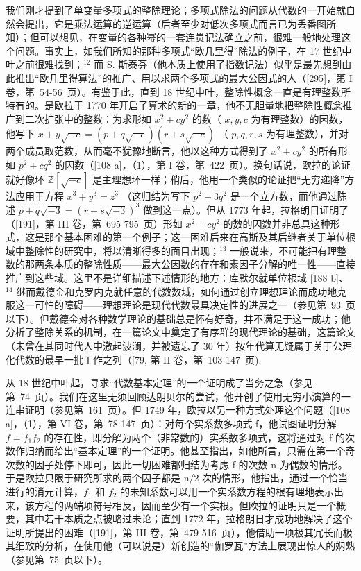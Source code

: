 我们刚才提到了单变量多项式的整除理论；多项式除法的问题从代数的一开始就自然会提出，它是乘法运算的逆运算（后者至少对低次多项式而言已为丢番图所知）；但可以想见，在变量的各种幂的一套连贯记法确立之前，很难一般地处理这个问题。事实上，如我们所知的那种多项式“欧几里得”除法的例子，在 17 世纪中叶之前很难找到；\(^{12}\) 而 S. 斯泰芬（他本质上使用了指数记法）似乎是最先想到由此推出“欧几里得算法”的推广、用以求两个多项式的最大公因式的人（{[}295{]}，第 I 卷，第~54-56~页）。有鉴于此，直到 18 世纪中叶，整除性概念一直是有理整数所特有的。是欧拉于 1770 年开启了算术的新的一章，他不无胆量地把整除性概念推广到二次扩张中的整数：为求形如 \(x^{2}+cy^{2}\) 的数（ \(x,y,c\) 为有理整数）的因数，他写下 \(x+y\sqrt{-c}=(p+q\sqrt{-c})(r+s\sqrt{-c})\) （ \(p,q,r,s\) 为有理整数），并对两个成员取范数，从而毫不犹豫地断言，他以这种方式得到了 \(x^{2}+cy^{2}\) 的所有形如 \(p^{2}+cq^{2}\) 的因数（{[}108 a{]}，（1），第 I 卷，第~422~页）。换句话说，欧拉的论证就好像环 \(\mathbb{Z}[\sqrt{-c}]\) 是主理想环一样；稍后，他用一个类似的论证把“无穷递降”方法应用于方程 \(x^{3}+y^{3}=z^{3}\) （这归结为写下 \(p^{2}+3q^{2}\) 是一个立方数，而他通过陈述 \(p+q\sqrt{-3}=(r+s\sqrt{-3})^{3}\) 做到这一点）。但从 1773 年起，拉格朗日证明了（{[}191{]}，第 III 卷，第~695-795~页）形如 \(x^{2}+cy^{2}\) 的数的因数并非总具这种形式，这是那个基本困难的第一个例子；这一困难后来在高斯及其后继者关于单位根域中整除性的研究中，将以清晰得多的面目出现；\(^{13}\) 一般说来，不可能把有理整数的那两条本质的整除性质——最大公因数的存在和素因子分解的唯一性——直接推广到这些域。这里不是详细描述下述情形的地方：库默尔就单位根域 {[}188 b{]}、\(^{14}\) 继而戴德金和克罗内克就任意的代数数域，如何通过创立理想理论而成功地克服这一可怕的障碍——理想理论是现代代数最具决定性的进展之一（参见第~93~页以下）。但戴德金对各种数学理论的基础总是怀有好奇，并不满足于这一成功；他分析了整除关系的机制，在一篇论文中奠定了有序群的现代理论的基础，这篇论文（未曾在其同时代人中激起波澜，并被遗忘了 30 年）按年代算无疑属于关于公理化代数的最早一批工作之列（{[}79, 第 II 卷，第~103-147~页).

从 18 世纪中叶起，寻求“代数基本定理”的一个证明成了当务之急（参见第~74~页）。我们在这里无须回顾达朗贝尔的尝试，他开创了使用无穷小演算的一连串证明（参见第~161~页）。但 1749 年，欧拉以另一种方式处理这个问题（{[}108 a{]}，（1），第 VI 卷，第~78-147~页）：对每个实系数多项式 f，他试图证明分解 \(f = f_{1}f_{2}\) 的存在性，即分解为两个（非常数的）实系数多项式，这将通过对 f 的次数作归纳而给出“基本定理”的一个证明。他甚至指出，如他所言，只需在第一个奇次数的因子处停下即可，因此一切困难都归结为考虑 f 的次数 n 为偶数的情形。于是欧拉只限于研究所求的两个因子都是 n/2 次的情形，他指出，通过一个恰当进行的消元计算，\(f_{1}\) 和 \(f_{2}\) 的未知系数可以用一个实系数方程的根有理地表示出来，该方程的两端项符号相反，因而至少有一个实根。但欧拉的证明只是一个概要，其中若干本质之点被略过未论；直到 1772 年，拉格朗日才成功地解决了这个证明所提出的困难（{[}191{]}，第 III 卷，第~479-516~页），他借助一项极其冗长而极其细致的分析，在使用他（可以说是）新创造的“伽罗瓦”方法上展现出惊人的娴熟（参见第~75~页以下）。

